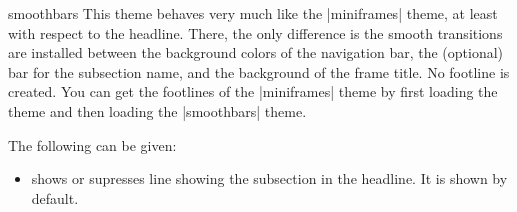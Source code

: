\begin{outerthemeexample}{smoothbars}
  This theme behaves very much like the |miniframes| theme, at least
  with respect to the headline. There, the only difference is the
  smooth transitions are installed between the background colors of
  the navigation bar, the (optional) bar for the subsection name, and
  the background of the frame title. No footline is created. You can
  get the footlines of the |miniframes| theme by first loading the
  theme and then loading the |smoothbars| theme.

  The following  can be given:
  \begin{itemize}
  \item {} shows or supresses
    line showing the subsection in the headline. It is shown by
    default.
  \end{itemize}  
\end{outerthemeexample}

